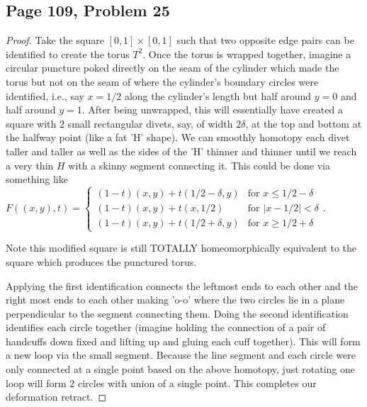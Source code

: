 \subsection*{Page 109, Problem 25}
\vspace{15pt}
\begin{proof}
    \vspace{-10pt}
    Take the square $[0,1]\times[0,1]$ such that two opposite  edge pairs can be identified to create the torus $T^2$. Once the torus is wrapped together, imagine a circular puncture poked directly on the seam of the cylinder which made the torus but not on the seam of where the cylinder's boundary circles were identified, i.e., say $x =  1/2$ along the cylinder's length but half around $y=0$ and half around $y=1$. After being unwrapped, this will essentially have created a square with 2 small rectangular divets, say, of width $2\delta$, at the top and bottom at the halfway point (like a fat 'H' shape). We can smoothly homotopy each divet taller and taller as well as the sides of the 'H' thinner and thinner until we reach a very thin $H$ with a skinny segment connecting it. This could be done via something like $F((x,y),t) = \begin{cases}(1-t)(x,y) + t(1/2-\delta,y) & \text{for }x \leq 1/2 - \delta\\ (1-t)(x,y) + t(x,1/2) & \text{for } |x - 1/2| < \delta \\ (1-t)(x,y) + t(1/2+\delta,y) & \text{for } x \geq 1/2 + \delta\end{cases}.$ 
    
    Note this modified square is still TOTALLY homeomorphically equivalent to the square which produces the punctured torus.
    
    Applying the first identification connects the leftmost ends to each other and the right most ends to each other making 'o-o' where the two circles lie in a plane perpendicular to the segment connecting them. Doing the second identification identifies each circle together (imagine holding the connection of a pair of handcuffs down fixed and lifting up and gluing each cuff together). This will form a new loop via the small segment. Because the line segment and each circle were only connected at a single point based on the above homotopy, just rotating one loop will form 2 circles with union of a single point. This completes our deformation retract.
\end{proof}


